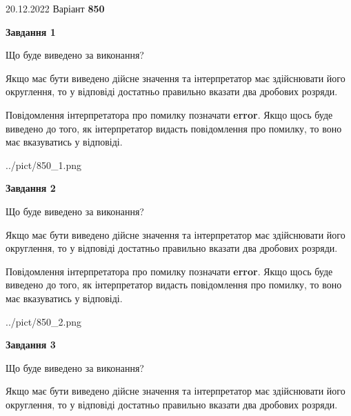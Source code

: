 \documentclass[12pt, ukrainian]{article}
\begin{document}
{20.12.2022 Варіант \No \textbf { 850 }\par}
{
\begin {Large}

{\begin {center}\textbf{Завдання 1}\end {center}}\par
Що буде виведено за виконання? \par

Якщо має бути виведено дійсне значення та інтерпретатор має здійснювати його округлення, 
то у відповіді достатньо правильно вказати два дробових розряди.

Повідомлення інтерпретатора про помилку позначати \textbf{error}.
Якщо щось буде виведено до того, як інтерпретатор видасть повідомлення про помилку, 
то воно має вказуватись у відповіді. \par

\begin{center}
	{../pict/850_1.png}
\end{center}
\newpage

{\begin {center}\textbf{Завдання 2}\end {center}}\par
Що буде виведено за виконання? \par

Якщо має бути виведено дійсне значення та інтерпретатор має здійснювати його округлення, 
то у відповіді достатньо правильно вказати два дробових розряди.

Повідомлення інтерпретатора про помилку позначати \textbf{error}.
Якщо щось буде виведено до того, як інтерпретатор видасть повідомлення про помилку, 
то воно має вказуватись у відповіді. \par

\begin{center}
	{../pict/850_2.png}
\end{center}
\newpage

{\begin {center}\textbf{Завдання 3}\end {center}}\par
Що буде виведено за виконання? \par

Якщо має бути виведено дійсне значення та інтерпретатор має здійснювати його округлення, 
то у відповіді достатньо правильно вказати два дробових розряди.


\end{Large}}
\end{document}
